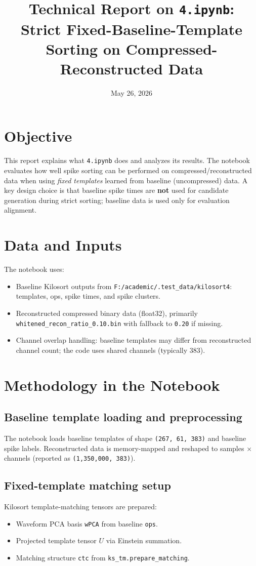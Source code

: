﻿\documentclass[11pt]{article}
\title{Technical Report on \texttt{4.ipynb}:\\Strict Fixed-Baseline-Template Sorting on Compressed-Reconstructed Data}
\author{}
\date{May 26, 2026}
\begin{document}
\maketitle

\section{Objective}
This report explains what \texttt{4.ipynb} does and analyzes its results. The notebook evaluates how well spike sorting can be performed on compressed/reconstructed data when using \emph{fixed templates} learned from baseline (uncompressed) data. A key design choice is that baseline spike times are \textbf{not} used for candidate generation during strict sorting; baseline data is used only for evaluation alignment.

\section{Data and Inputs}
The notebook uses:
\begin{itemize}
  \item Baseline Kilosort outputs from \texttt{F:/academic/.test\_data/kilosort4}: templates, ops, spike times, and spike clusters.
  \item Reconstructed compressed binary data (float32), primarily \texttt{whitened\_recon\_ratio\_0.10.bin} with fallback to \texttt{0.20} if missing.
  \item Channel overlap handling: baseline templates may differ from reconstructed channel count; the code uses shared channels (typically 383).
\end{itemize}

\section{Methodology in the Notebook}
\subsection{Baseline template loading and preprocessing}
The notebook loads baseline templates of shape \texttt{(267, 61, 383)} and baseline spike labels. Reconstructed data is memory-mapped and reshaped to samples $\times$ channels (reported as \texttt{(1,350,000, 383)}).

\subsection{Fixed-template matching setup}
Kilosort template-matching tensors are prepared:
\begin{itemize}
  \item Waveform PCA basis \texttt{wPCA} from baseline \texttt{ops}.
  \item Projected template tensor $U$ via Einstein summation.
  \item Matching structure \texttt{ctc} from \texttt{ks\_tm.prepare\_matching}.
\end{itemize}
\end{document}
